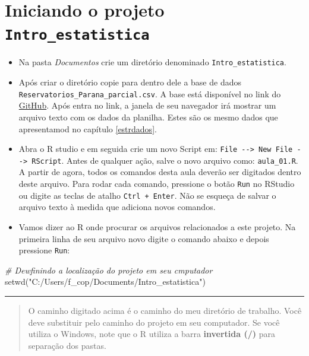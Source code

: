 \documentclass[
]{book}
\newenvironment{Shaded}{\begin{snugshade}}{\end{snugshade}}
\newcommand{\CommentTok}[1]{\textcolor[rgb]{0.56,0.35,0.01}{\textit{#1}}}
\newcommand{\FunctionTok}[1]{\textcolor[rgb]{0.00,0.00,0.00}{#1}}
\newcommand{\NormalTok}[1]{#1}
\newcommand{\StringTok}[1]{\textcolor[rgb]{0.31,0.60,0.02}{#1}}
\begin{document}
\hypertarget{iniciando-o-projeto-intro_estatistica}{%
\section{\texorpdfstring{Iniciando o projeto \texttt{Intro\_estatistica}}{Iniciando o projeto Intro\_estatistica}}\label{iniciando-o-projeto-intro_estatistica}}

\begin{itemize}
\item
  Na pasta \emph{Documentos} crie um diretório denominado \texttt{Intro\_estatistica}.
\item
  Após criar o diretório copie para dentro dele a base de dados \texttt{Reservatorios\_Parana\_parcial.csv}. A base está disponível no link do \href{https://github.com/FCopf/probest-cambientais/blob/master/datasets/Reservatorios_Parana_parcial.csv}{GitHub}. Após entra no link, a janela de seu navegador irá mostrar um arquivo texto com os dados da planilha. Estes são os mesmo dados que apresentamod no capítulo \ref{estrdados}.
\item
  Abra o R studio e em seguida crie um novo Script em: \texttt{File\ -\/-\textgreater{}\ New\ File\ -\/-\textgreater{}\ RScript}. Antes de qualquer ação, salve o novo arquivo como: \texttt{aula\_01.R}. A partir de agora, todos os comandos desta aula deverão ser digitados dentro deste arquivo. Para rodar cada comando, pressione o botão \texttt{Run} no RStudio ou digite as teclas de atalho \texttt{Ctrl\ +\ Enter}. Não se esqueça de salvar o arquivo texto à medida que adiciona novos comandos.
\item
  Vamos dizer ao R onde procurar os arquivos relacionados a este projeto. Na primeira linha de seu arquivo novo digite o comando abaixo e depois pressione \texttt{Run}:
\end{itemize}

\begin{Shaded}
\begin{Highlighting}[]
\CommentTok{\# Dewfinindo a localização do projeto em seu cmputador}
\FunctionTok{setwd}\NormalTok{(}\StringTok{"C:/Users/f\_cop/Documents/Intro\_estatistica"}\NormalTok{)}
\end{Highlighting}
\end{Shaded}

\begin{center}\rule{0.5\linewidth}{0.5pt}\end{center}

\begin{quote}
O caminho digitado acima é o caminho do meu diretório de trabalho. Você deve substituir pelo caminho do projeto em seu computador. Se você utiliza o Windows, note que o R utiliza a barra \textbf{invertida (/)} para separação dos pastas.
\end{quote}
\end{document}
